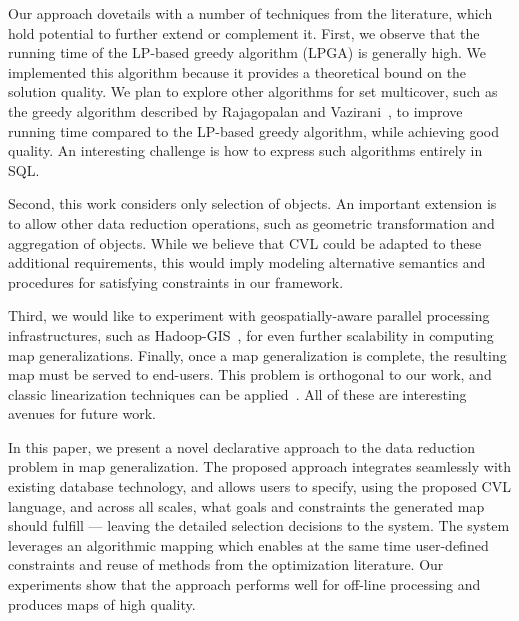 \documentclass[11pt, oneside]{report}
\begin{document}
Our approach dovetails with a number of techniques from the literature, which hold potential to further extend or complement it. First, we observe that the running time of the LP-based greedy algorithm (LPGA) is generally high. We implemented this algorithm because it provides a theoretical bound on the solution quality. We plan to explore other algorithms for set multicover, such as the greedy algorithm described by Rajagopalan and Vazirani~\cite{rajagopalan1998primal}, to improve running time compared to the LP-based greedy algorithm, while achieving good quality. An interesting challenge is how to express such algorithms entirely in SQL.

Second, this work considers only selection of objects. An important extension is to allow other data reduction operations, such as geometric transformation and aggregation of objects. While we believe that CVL could be adapted to these additional requirements, this would imply modeling alternative semantics and procedures for satisfying constraints in our framework.

Third, we would like to experiment with geospatially-aware parallel processing infrastructures, such as Hadoop-GIS~\cite{Aji:2013:HadoopGIS}, for even further scalability in computing map generalizations. Finally, once a map generalization is complete, the resulting map must be served to end-users. This problem is orthogonal to our work, and classic linearization techniques can be applied~\cite{hilbert1891ueber}. All of these are interesting avenues for future work.


In this paper, we present a novel declarative approach to the data reduction problem in map generalization. 
The proposed approach integrates seamlessly with existing database technology, and allows users to specify, using the proposed CVL language, and across all scales, what goals and constraints the generated map should fulfill --- leaving the detailed selection decisions to the system. The system leverages an algorithmic mapping which enables at the same time user-defined constraints and reuse of methods from the optimization literature. Our experiments show that the approach performs well for off-line processing and produces maps of high quality.


\end{document}
